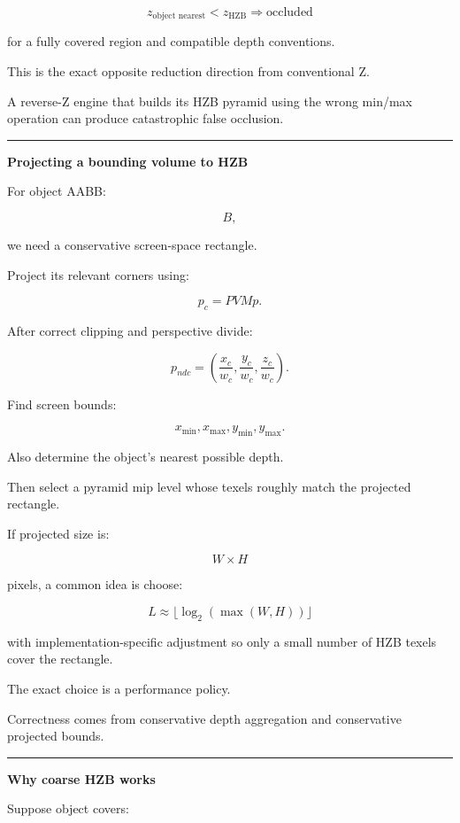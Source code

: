 \[
\boxed{
z_{\text{object nearest}}
<
z_{\text{HZB}}
\Rightarrow
\text{occluded}
}
\]

for a fully covered region and compatible depth conventions.

This is the exact opposite reduction direction from conventional Z.

A reverse-Z engine that builds its HZB pyramid using the wrong min/max operation can produce catastrophic false occlusion.

\begin{center}\rule{0.5\linewidth}{0.5pt}\end{center}

\textbf{Projecting a bounding volume to HZB}

For object AABB:

\[
B,
\]

we need a conservative screen-space rectangle.

Project its relevant corners using:

\[
p_c=PVMp.
\]

After correct clipping and perspective divide:

\[
p_{ndc}=
\left(
\frac{x_c}{w_c},
\frac{y_c}{w_c},
\frac{z_c}{w_c}
\right).
\]

Find screen bounds:

\[
x_{\min},x_{\max},
y_{\min},y_{\max}.
\]

Also determine the object's nearest possible depth.

Then select a pyramid mip level whose texels roughly match the projected rectangle.

If projected size is:

\[
W\times H
\]

pixels, a common idea is choose:

\[
L\approx
\lfloor
\log_2(\max(W,H))
\rfloor
\]

with implementation-specific adjustment so only a small number of HZB texels cover the rectangle.

The exact choice is a performance policy.

Correctness comes from conservative depth aggregation and conservative projected bounds.

\begin{center}\rule{0.5\linewidth}{0.5pt}\end{center}

\textbf{Why coarse HZB works}

Suppose object covers:

